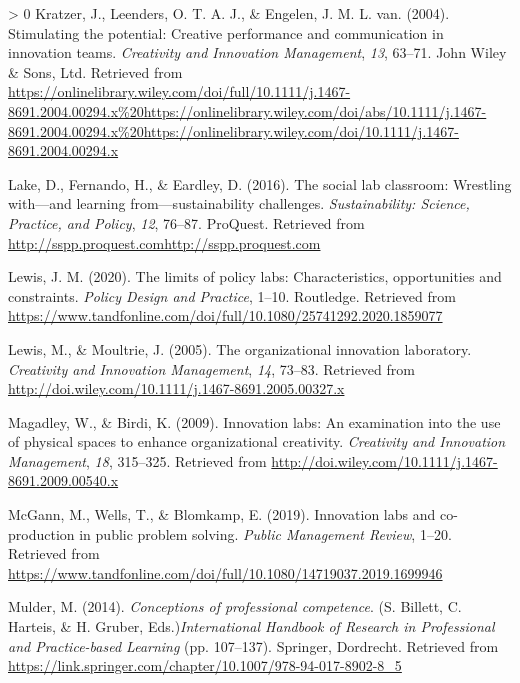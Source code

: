 \documentclass[]{elsarticle} %
\newlength{\cslhangindent}
\newenvironment{CSLReferences}[3] %
 {%
  \setlength{\parindent}{0pt}
  \ifodd #1 \everypar{\setlength{\hangindent}{\cslhangindent}}\ignorespaces\fi
  \ifnum #2 > 0
  \setlength{\parskip}{#2\baselineskip}
  \fi
 }%
 {}
\begin{document}
\begin{CSLReferences}{1}{0}
\leavevmode\hypertarget{ref-Kratzer2004}{}%
Kratzer, J., Leenders, O. T. A. J., \& Engelen, J. M. L. van. (2004).
Stimulating the potential: Creative performance and communication in
innovation teams. \emph{Creativity and Innovation Management},
\emph{13}, 63--71. John Wiley \& Sons, Ltd. Retrieved from
\url{https://onlinelibrary.wiley.com/doi/full/10.1111/j.1467-8691.2004.00294.x\%20https://onlinelibrary.wiley.com/doi/abs/10.1111/j.1467-8691.2004.00294.x\%20https://onlinelibrary.wiley.com/doi/10.1111/j.1467-8691.2004.00294.x}

\leavevmode\hypertarget{ref-Lake2016}{}%
Lake, D., Fernando, H., \& Eardley, D. (2016). The social lab classroom:
Wrestling with---and learning from---sustainability challenges.
\emph{Sustainability: Science, Practice, and Policy}, \emph{12}, 76--87.
ProQuest. Retrieved from
\url{http://sspp.proquest.comhttp://sspp.proquest.com}

\leavevmode\hypertarget{ref-Lewis2020}{}%
Lewis, J. M. (2020). The limits of policy labs: Characteristics,
opportunities and constraints. \emph{Policy Design and Practice}, 1--10.
Routledge. Retrieved from
\url{https://www.tandfonline.com/doi/full/10.1080/25741292.2020.1859077}

\leavevmode\hypertarget{ref-Lewis2005}{}%
Lewis, M., \& Moultrie, J. (2005). The organizational innovation
laboratory. \emph{Creativity and Innovation Management}, \emph{14},
73--83. Retrieved from
\url{http://doi.wiley.com/10.1111/j.1467-8691.2005.00327.x}

\leavevmode\hypertarget{ref-Magadley2009}{}%
Magadley, W., \& Birdi, K. (2009). Innovation labs: An examination into
the use of physical spaces to enhance organizational creativity.
\emph{Creativity and Innovation Management}, \emph{18}, 315--325.
Retrieved from
\url{http://doi.wiley.com/10.1111/j.1467-8691.2009.00540.x}

\leavevmode\hypertarget{ref-McGann2019}{}%
McGann, M., Wells, T., \& Blomkamp, E. (2019). Innovation labs and
co-production in public problem solving. \emph{Public Management
Review}, 1--20. Retrieved from
\url{https://www.tandfonline.com/doi/full/10.1080/14719037.2019.1699946}

\leavevmode\hypertarget{ref-Mulder2014}{}%
Mulder, M. (2014). \emph{Conceptions of professional competence}. (S.
Billett, C. Harteis, \& H. Gruber, Eds.)\emph{International Handbook of
Research in Professional and Practice-based Learning} (pp. 107--137).
Springer, Dordrecht. Retrieved from
\url{https://link.springer.com/chapter/10.1007/978-94-017-8902-8_5}


\end{CSLReferences}
\end{document}
